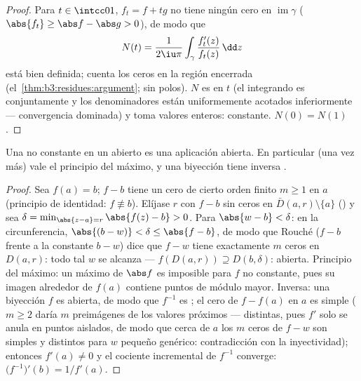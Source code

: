 \begin{proof}
Para $t \in \intcc01$, $f_t = f + tg$ no tiene ningún cero en
$\operatorname{im}\gamma$ ($\abs{f_t} \geq \abs f - \abs g >
0$), de modo que
\[
N(t) = \frac1{2\iu\pi}\int_\gamma
\frac{f_t'(z)}{f_t(z)}\,\dd z
\]
está bien definida; cuenta los ceros en la región encerrada
(el~\cref{thm:b3:residues:argument}; sin polos). $N$ es
 en $t$ (el integrando es
 conjuntamente y los
denominadores están uniformemente acotados inferiormente ---
convergencia dominada) y toma valores enteros: constante. $N(0) = N(1)$.
\end{proof}

\begin{corollary}
\label{cor:b3:residues:openmapping}
Una  no constante en
un abierto
 es una aplicación abierta. En
particular (una vez más) vale el principio del máximo, y una biyección
 tiene inversa
.
\end{corollary}

\begin{proof}
Sea $f(a) = b$; $f - b$ tiene un cero de cierto orden finito $m
\geq 1$ en $a$ (principio de identidad: $f \not\equiv b$). Elíjase $r$
con $f - b$ sin ceros en $\bar D(a, r)\setminus\{a\}$
() y sea
$\delta = \min_{\abs{z - a} =
r}\abs{f(z) - b} > 0$. Para $\abs{w - b} < \delta$: en la
circunferencia, $\abs{(b - w)} < \delta \leq \abs{f - b}$, de modo que
Rouché ($f - b$ frente a la constante $b - w$) dice que $f - w$ tiene
exactamente $m$ ceros en $D(a, r)$: todo tal $w$ se alcanza ---
$f(D(a,r)) \supseteq D(b, \delta)$: abierta. Principio del máximo: un
máximo  de $\abs f$ es
imposible para $f$ no constante, pues su imagen alrededor de $f(a)$
contiene puntos de módulo mayor. Inversa: una biyección
 $f$ es abierta, de modo que
$f^{-1}$ es ; el cero de
$f - f(a)$ en $a$ es simple ($m \geq 2$ daría $m$ preimágenes de los
valores próximos --- distintas, pues $f'$ solo se anula en puntos
aislados, de modo que cerca de $a$ los $m$ ceros de $f - w$ son simples
y distintos para $w$ pequeño genérico: contradicción con la
inyectividad); entonces $f'(a) \neq 0$ y el cociente incremental de
$f^{-1}$ converge: $\bigl(f^{-1}\bigr)'(b) =
1/f'(a)$.
\end{proof}

